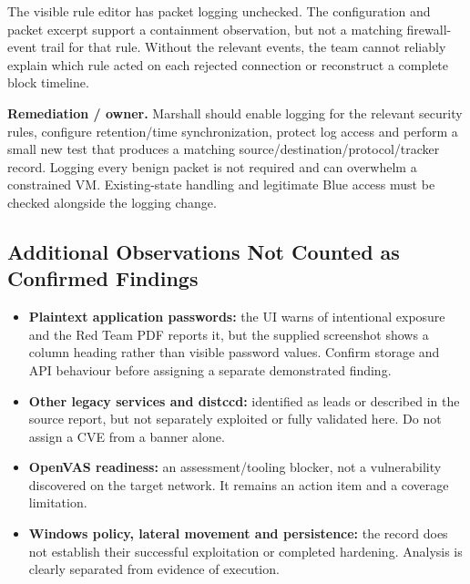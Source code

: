 \documentclass[11pt,a4paper]{article}
\begin{document}
The visible rule editor has packet logging unchecked. The configuration and packet excerpt support a containment observation, but not a matching firewall-event trail for that rule. Without the relevant events, the team cannot reliably explain which rule acted on each rejected connection or reconstruct a complete block timeline.

\textbf{Remediation / owner.} Marshall should enable logging for the relevant security rules, configure retention/time synchronization, protect log access and perform a small new test that produces a matching source/destination/protocol/tracker record. Logging every benign packet is not required and can overwhelm a constrained VM. Existing-state handling and legitimate Blue access must be checked alongside the logging change.

\subsection{Additional Observations Not Counted as Confirmed Findings}
\begin{itemize}
\item \textbf{Plaintext application passwords:} the UI warns of intentional exposure and the Red Team PDF reports it, but the supplied screenshot shows a column heading rather than visible password values. Confirm storage and API behaviour before assigning a separate demonstrated finding.
\item \textbf{Other legacy services and distccd:} identified as leads or described in the source report, but not separately exploited or fully validated here. Do not assign a CVE from a banner alone.
\item \textbf{OpenVAS readiness:} an assessment/tooling blocker, not a vulnerability discovered on the target network. It remains an action item and a coverage limitation.
\item \textbf{Windows policy, lateral movement and persistence:} the record does not establish their successful exploitation or completed hardening. Analysis is clearly separated from evidence of execution.
\end{itemize}
\end{document}

